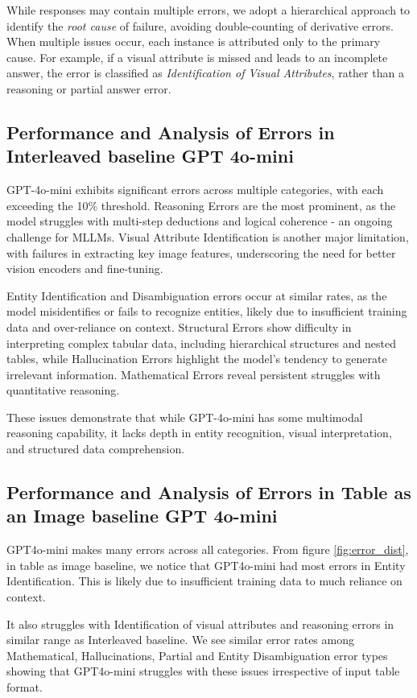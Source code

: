 \documentclass[11pt]{article}
\begin{document}
While responses may contain multiple errors, we adopt a hierarchical approach to identify the \textit{root cause} of failure, avoiding double-counting of derivative errors. When multiple issues occur, each instance is attributed only to the primary cause. For example, if a visual attribute is missed and leads to an incomplete answer, the error is classified as \textit{Identification of Visual Attributes}, rather than a reasoning or partial answer error.

\subsection{Performance and Analysis of Errors in Interleaved baseline GPT 4o-mini}

GPT-4o-mini exhibits significant errors across multiple categories, with each exceeding the 10\% threshold. Reasoning Errors are the most prominent, as the model struggles with multi-step deductions and logical coherence - an ongoing challenge for MLLMs. Visual Attribute Identification is another major limitation, with failures in extracting key image features, underscoring the need for better vision encoders and fine-tuning.

Entity Identification and Disambiguation errors occur at similar rates, as the model misidentifies or fails to recognize entities, likely due to insufficient training data and over-reliance on context. Structural Errors show difficulty in interpreting complex tabular data, including hierarchical structures and nested tables, while Hallucination Errors highlight the model’s tendency to generate irrelevant information. Mathematical Errors reveal persistent struggles with quantitative reasoning.

These issues demonstrate that while GPT-4o-mini has some multimodal reasoning capability, it lacks depth in entity recognition, visual interpretation, and structured data comprehension.

\subsection{Performance and Analysis of Errors in Table as an Image baseline GPT 4o-mini}
GPT4o-mini makes many errors across all categories. From figure \ref{fig:error_dist}, in table as image baseline, we notice that GPT4o-mini had most errors in Entity Identification. This is likely due to insufficient training data to much reliance on context.

It also struggles with Identification of visual attributes and reasoning errors in similar range as Interleaved baseline. We see similar error rates among Mathematical, Hallucinations, Partial and Entity Disambiguation error types showing that GPT4o-mini struggles with these issues irrespective of input table format.
\end{document}
